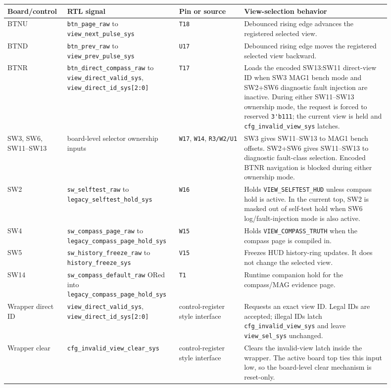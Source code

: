 \documentclass{article}
\newcommand{\sig}[1]{\begingroup\nolinkurl{#1}\endgroup}
\begin{document}
\begin{longtable}{p{0.14\linewidth} p{0.24\linewidth} p{0.16\linewidth} p{0.36\linewidth}}
\toprule
\textbf{Board/control} & \textbf{RTL signal} & \textbf{Pin or source} & \textbf{View-selection behavior} \\
\midrule
\endhead
BTNU &
\sig{btn_page_raw} to \sig{view_next_pulse_sys} &
\sig{T18} &
Debounced rising edge advances the registered selected view. \\

BTND &
\sig{btn_prev_raw} to \sig{view_prev_pulse_sys} &
\sig{U17} &
Debounced rising edge moves the registered selected view backward. \\

BTNR &
\sig{btn_direct_compass_raw} to \sig{view_direct_valid_sys},
\sig{view_direct_id_sys[2:0]} &
\sig{T17} &
Loads the encoded SW13:SW11 direct-view ID when SW3 MAG1 bench mode and SW2+SW6
diagnostic fault injection are inactive.  During either SW11--SW13 ownership
mode, the request is forced to reserved \sig{3'b111}; the current view is held
and \sig{cfg_invalid_view_sys} latches. \\

SW3, SW6, SW11--SW13 &
board-level selector ownership inputs &
\sig{W17}, \sig{W14}, \sig{R3/W2/U1} &
SW3 gives SW11--SW13 to MAG1 bench offsets.  SW2+SW6 gives SW11--SW13 to
diagnostic fault-class selection.  Encoded BTNR navigation is blocked during
either ownership mode. \\

SW2 &
\sig{sw_selftest_raw} to \sig{legacy_selftest_hold_sys} &
\sig{W16} &
Holds \sig{VIEW_SELFTEST_HUD} unless compass hold is active.  In the current
top, SW2 is masked out of self-test hold when SW6 log/fault-injection mode is
also active. \\

SW4 &
\sig{sw_compass_page_raw} to \sig{legacy_compass_page_hold_sys} &
\sig{W15} &
Holds \sig{VIEW_COMPASS_TRUTH} when the compass page is compiled in. \\

SW5 &
\sig{sw_history_freeze_raw} to \sig{history_freeze_sys} &
\sig{V15} &
Freezes HUD history-ring updates.  It does not change the selected view. \\

SW14 &
\sig{sw_compass_default_raw} ORed into \sig{legacy_compass_page_hold_sys} &
\sig{T1} &
Runtime companion hold for the compass/MAG evidence page. \\

Wrapper direct ID &
\sig{view_direct_valid_sys}, \sig{view_direct_id_sys[2:0]} &
control-register style interface &
Requests an exact view ID.  Legal IDs are accepted; illegal IDs latch
\sig{cfg_invalid_view_sys} and leave \sig{view_sel_sys} unchanged. \\

Wrapper clear &
\sig{cfg_invalid_view_clear_sys} &
control-register style interface &
Clears the invalid-view latch inside the wrapper.  The active board top ties
this input low, so the board-level clear mechanism is reset-only. \\
\bottomrule
\end{longtable}
\end{document}
